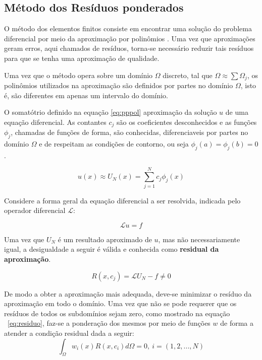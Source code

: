 \subsection{Método dos Resíduos ponderados}

O método dos elementos finitos consiste em encontrar uma  solução do problema diferencial por meio da aproximação por polinômios 
\citep[p. 97]{davis}. Uma vez que aproximações geram erros, aqui chamados de resíduos, torna-se necessário reduzir tais resíduos para que se tenha uma aproximação de qualidade.

Uma vez que o método opera sobre um domínio $ \Omega $ discreto, tal que $ \Omega \approx \sum \Omega_j $,  os polinômios utilizados na aproximação são definidos por partes no domínio $\Omega$, isto é, são diferentes em apenas um intervalo do domínio.

O somatótrio definido na equação \ref{eq:pppol} aproximação da solução $ u $ de uma equação diferencial. As contantes $ c_j $ são os coeficientes desconhecidos e as funções $ \phi_j $, chamadas de funções de forma, são conhecidas, diferenciaveis por partes no domínio $ \Omega $ e de respeitam as condições de contorno, ou seja $ \phi_j(a) = \phi_j(b) = 0 $. 
 

\begin{equation}
	\label{eq:pppol}
	u(x) \approx U_N (x) = \sum_{j = 1}^{N} c_j \phi_j (x)
\end{equation}

Considere a forma geral da equação diferencial a ser resolvida, indicada pelo operador diferencial $ \mathcal{L} $:
 
 \begin{equation}
 	\label{eq:opDif}
 	\mathcal{L} u = f
 \end{equation}
 
 Uma vez que $U_N$ é um resultado aproximado de $u$, mas não necessariamente igual, a desigualdade a seguir é válida e conhecida como \textbf{residual da aproximação}.
 
 \begin{equation}
 \label{eq:residuo}
 	R(x, c_j) = \mathcal{L} U_N - f \neq 0
 \end{equation}
 
 De modo a obter a aproximação mais adequada, deve-se minimizar o resíduo da aproximação em todo o domínio. Uma vez que não se pode requerer que os resíduos de todos os subdomínios sejam zero, como mostrado na equação ~\ref{eq:residuo}, faz-se a ponderação dos mesmos por meio de funções $w$ de forma a atender a condição residual dada a seguir:
 \begin{equation}
 \label{eq:intResPond}
	\int_{\Omega} w_i(x)R(x, c_i)d\Omega = 0, \ i = (1, 2, ..., N)
 \end{equation} 
 
